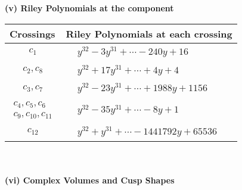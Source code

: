 \documentclass[1p]{elsarticle_modified}
\theoremstyle{definition}
\begin{document}
\newpage\renewcommand{\arraystretch}{1}
\flushleft \textbf{(v) Riley Polynomials at the component}\newline \\
\begin{tabular}{m{50pt}|m{274pt}}
Crossings & \hspace{64pt}Riley Polynomials at each crossing \\
\hline $$\begin{aligned}c_{1}\end{aligned}$$&$\begin{aligned}
&y^{32}-3 y^{31}+\cdots-240 y+16
\end{aligned}$\\
\hline $$\begin{aligned}c_{2},c_{8}\end{aligned}$$&$\begin{aligned}
&y^{32}+17 y^{31}+\cdots+4 y+4
\end{aligned}$\\
\hline $$\begin{aligned}c_{3},c_{7}\end{aligned}$$&$\begin{aligned}
&y^{32}-23 y^{31}+\cdots+1988 y+1156
\end{aligned}$\\
\hline $$\begin{aligned}c_{4},c_{5},c_{6}\\c_{9},c_{10},c_{11}\end{aligned}$$&$\begin{aligned}
&y^{32}-35 y^{31}+\cdots-8 y+1
\end{aligned}$\\
\hline $$\begin{aligned}c_{12}\end{aligned}$$&$\begin{aligned}
&y^{32}+y^{31}+\cdots-1441792 y+65536
\end{aligned}$\\
\hline
\end{tabular}\\~\\
\newpage\flushleft \textbf{(vi) Complex Volumes and Cusp Shapes}
\end{document}
